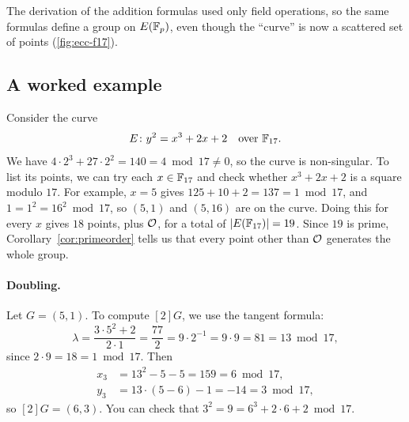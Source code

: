 The derivation of the addition formulas used only field operations,
so the same formulas define a group on $E(\mathbb{F}_p)$, even though the
``curve'' is now a scattered set of points (\cref{fig:ecc-f17}).

\subsection{A worked example}

Consider the curve
\[ E \colon y^2 = x^3 + 2x + 2 \quad \text{over } \mathbb{F}_{17}. \]
We have $4 \cdot 2^3 + 27 \cdot 2^2 = 140 = 4 \bmod 17 \neq 0$, so the
curve is non-singular.
To list its points, we can try each $x \in \mathbb{F}_{17}$ and check whether
$x^3 + 2x + 2$ is a square modulo $17$.
For example, $x = 5$ gives $125 + 10 + 2 = 137 = 1 \bmod 17$,
and $1 = 1^2 = 16^2 \bmod 17$, so $(5, 1)$ and $(5, 16)$ are on the curve.
Doing this for every $x$ gives $18$ points, plus $\calO$, for a total of
$|E(\mathbb{F}_{17})| = 19$.
Since $19$ is prime, Corollary~\ref{cor:primeorder} tells us that every point
other than $\calO$ generates the whole group.

\begin{marginfigure}
\centering
{}
\caption{The $18$ affine points of $y^2 = x^3 + 2x + 2$ over $\F_{17}$
(the $19$th point, $\calO$, is not shown). The points are symmetric about
the dashed line $y = 17/2$, since $(x, y)$ and $(x, 17 - y) = (x, -y)$ are
both on the curve.}
\label{fig:ecc-f17}
\end{marginfigure}

\paragraph{Doubling.}
Let $G = (5, 1)$. To compute $[2]G$, we use the tangent formula:
\[ \lambda = \frac{3 \cdot 5^2 + 2}{2 \cdot 1} = \frac{77}{2} = 9 \cdot 2^{-1}
   = 9 \cdot 9 = 81 = 13 \bmod 17, \]
since $2 \cdot 9 = 18 = 1 \bmod 17$. Then
\begin{align*}
  x_3 &= 13^2 - 5 - 5 = 159 = 6 \bmod 17,\\
  y_3 &= 13 \cdot (5 - 6) - 1 = -14 = 3 \bmod 17,
\end{align*}
so $[2]G = (6, 3)$. You can check that $3^2 = 9 = 6^3 + 2 \cdot 6 + 2 \bmod 17$.

